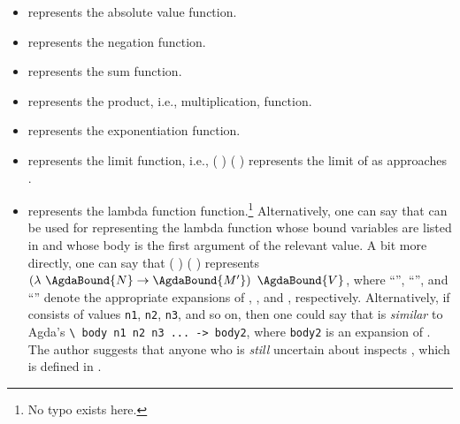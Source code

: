 \documentclass{report}
\begin{document}
\begin{itemize}
  \item {} represents the absolute value function.
  \item {} represents the negation function.
  \item {} represents the sum function.
  \item {} represents the product, i.e., multiplication, function.
  \item {} represents the exponentiation function.
  \item {} represents the limit function, i.e.,  \AgdaSymbol( \AgdaSymbol) \AgdaSymbol(    \AgdaSymbol) represents the limit of  as  approaches .
  \item {} represents the lambda function function.\footnote{No typo exists here.}  Alternatively, one can say that   can be used for representing the lambda function whose bound variables are listed in  and whose body is the first argument of the relevant  value.  A bit more directly, one can say that  \AgdaSymbol( \AgdaSymbol) \AgdaSymbol(  \AgdaSymbol) represents \(\left(\lambda\ \AgdaBound{N} \rightarrow \AgdaBound{M'}\right)\ \AgdaBound{V}\), where ``'', ``'', and ``'' denote the appropriate expansions of , , and , respectively.  Alternatively, if  consists of values \texttt{n1}, \texttt{n2}, \texttt{n3}, and so on, then one could say that   is \emph{similar} to Agda's \texttt{\textbackslash\ body n1 n2 n3 ... -> body2}, where \texttt{body2} is an expansion of .  The author suggests that anyone who is \emph{still} uncertain about  inspects , which is defined in .
  {
    \newcommand{\boilerplateBogusTrigCrap}[2]{
      \item \AgdaInductiveConstructor{#1} represents the trigonometric #2 function.
    }

}
\end{itemize}
\end{document}
